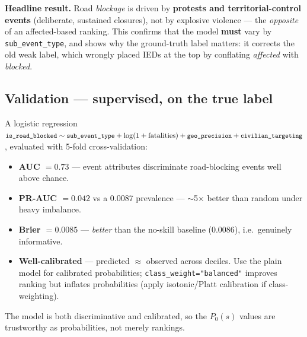 \documentclass[11pt,a4paper]{article}
\newcommand{\code}[1]{\texttt{\small #1}}
\begin{document}
\begin{notebox}
\textbf{Headline result.} Road \emph{blockage} is driven by \textbf{protests and
territorial-control events} (deliberate, sustained closures), not by explosive violence --- the
\emph{opposite} of an affected-based ranking. This confirms that the model \textbf{must} vary by
\code{sub\_event\_type}, and shows why the ground-truth label matters: it corrects the old weak
label, which wrongly placed IEDs at the top by conflating \emph{affected} with \emph{blocked}.
\end{notebox}

\subsection{Validation --- supervised, on the true label}

A logistic regression $\code{is\_road\_blocked}\sim\code{sub\_event\_type}+\log(1+\text{fatalities})
+\code{geo\_precision}+\code{civilian\_targeting}$, evaluated with 5-fold cross-validation:

\begin{itemize}[nosep,leftmargin=1.4em]
  \item \textbf{AUC $= 0.73$} --- event attributes discriminate road-blocking events well above
        chance.
  \item \textbf{PR-AUC $= 0.042$} vs a 0.0087 prevalence --- $\sim$5$\times$ better than random
        under heavy imbalance.
  \item \textbf{Brier $= 0.0085$} --- \emph{better} than the no-skill baseline (0.0086), i.e.\
        genuinely informative.
  \item \textbf{Well-calibrated} --- predicted $\approx$ observed across deciles. Use the plain
        model for calibrated probabilities; \code{class\_weight="balanced"} improves ranking but
        inflates probabilities (apply isotonic/Platt calibration if class-weighting).
\end{itemize}

The model is both discriminative and calibrated, so the $P_0(s)$ values are trustworthy as
probabilities, not merely rankings.
\end{document}
